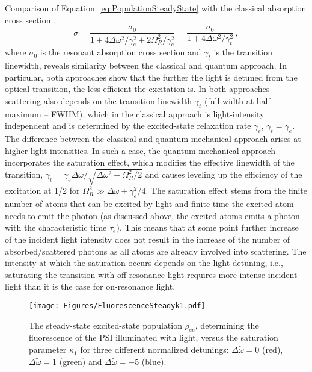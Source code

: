 Comparison of Equation~\ref{eq:PopulationSteadyState} with the classical absorption cross section \cite{Hulst2012Light},
\begin{equation}
    \sigma=\frac{\sigma_0}{1+4\Delta\omega^2/\gamma_e^2+2\Omega_R^2/\gamma_e^2}=\frac{\sigma_0}{1+4\Delta\omega^2/\gamma_t^2}\,,
    \label{eq:AbsorptionCrossSection}
\end{equation}
where $\sigma_0$ is the resonant absorption cross section and $\gamma_t$ is the transition linewidth, reveals similarity between the classical and quantum approach.  In particular, both approaches show that the further the light is detuned from the optical transition, the less efficient the excitation is.  In both approaches scattering also depends on the transition linewidth $\gamma_t$ (full width at half maximum -- FWHM), which in the classical approach is light-intensity independent and is determined by the excited-state relaxation rate $\gamma_e$, $\gamma_t=\gamma_e$.  The difference between the classical and quantum mechanical approach arises at higher light intensities.  In such a case, the quantum-mechanical approach incorporates the saturation effect, which modifies the effective linewidth of the transition, $\gamma_t=\gamma_e \Delta\omega/\sqrt{\Delta\omega^2+\Omega_R^2/2}$ and causes leveling up the efficiency of the excitation at 1/2 for $\Omega_R^2\gg \Delta\omega+\gamma_e^2/4$.  The saturation effect stems from the finite number of atoms that can be excited by light and finite time the excited atom needs to emit the photon (as discussed above, the excited atoms emits a photon with the characteristic time $\tau_e$).  This means that at some point further increase of the incident light intensity does not result in the increase of the number of absorbed/scattered photons as all atoms are already involved into scattering.  The intensity at which the saturation occurs depends on the light detuning, i.e., saturating the transition with off-resonance light requires more intense incident light than it is the case for on-resonance light.
\begin{figure}[!htbp]
    \centering
    \texttt{[image: Figures/FluorescenceSteadyk1.pdf]}
    \caption{The steady-state excited-state population $\rho_{ee}$, determining the fluorescence of the PSI illuminated with light, versus the saturation parameter $\kappa_1$ for three different normalized detunings: $\Delta\tilde\omega=0$ (red), $\Delta\tilde\omega=1$ (green) and $\Delta\tilde\omega=-5$ (blue).}
    \label{fig:FluorescenceSteadyState}
\end{figure}


